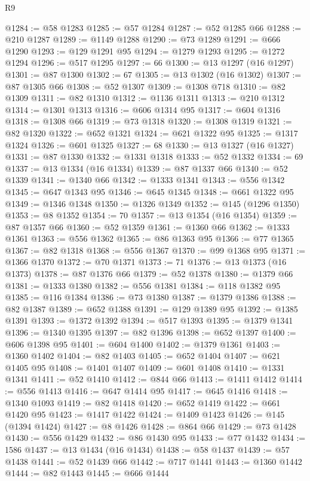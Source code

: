 \begin{lexlean}{R9}
\begin{coremodule}
@1284 := @58 @1283
@1285 := @57 @1284
@1287 := @52 @1285 @66
@1288 := @210 @1287
@1289 := @1149 @1288
@1290 := @73 @1289
@1291 := @666 @1290
@1293 := @129 @1291 @95
@1294 := @1279 @1293
@1295 := @1272 @1294
@1296 := @517 @1295
@1297 := 66
@1300 := @13 @1297 (@16 @1297)
@1301 := @87 @1300
@1302 := 67
@1305 := @13 @1302 (@16 @1302)
@1307 := @87 @1305 @66
@1308 := @52 @1307
@1309 := @1308 @718
@1310 := @82 @1309
@1311 := @82 @1310
@1312 := @1136 @1311
@1313 := @210 @1312
@1314 := @1301 @1313
@1316 := @606 @1314 @95
@1317 := @604 @1316
@1318 := @1308 @66
@1319 := @73 @1318
@1320 := @1308 @1319
@1321 := @82 @1320
@1322 := @652 @1321
@1324 := @621 @1322 @95
@1325 := @1317 @1324
@1326 := @601 @1325
@1327 := 68
@1330 := @13 @1327 (@16 @1327)
@1331 := @87 @1330
@1332 := @1331 @1318
@1333 := @52 @1332
@1334 := 69
@1337 := @13 @1334 (@16 @1334)
@1339 := @87 @1337 @66
@1340 := @52 @1339
@1341 := @1340 @66
@1342 := @1333 @1341
@1343 := @556 @1342
@1345 := @647 @1343 @95
@1346 := @645 @1345
@1348 := @661 @1322 @95
@1349 := @1346 @1348
@1350 := @1326 @1349
@1352 := @145 (@1296 @1350)
@1353 := @8 @1352
@1354 := 70
@1357 := @13 @1354 (@16 @1354)
@1359 := @87 @1357 @66
@1360 := @52 @1359
@1361 := @1360 @66
@1362 := @1333 @1361
@1363 := @556 @1362
@1365 := @86 @1363 @95
@1366 := @77 @1365
@1367 := @82 @1318
@1368 := @556 @1367
@1370 := @99 @1368 @95
@1371 := @1366 @1370
@1372 := @70 @1371
@1373 := 71
@1376 := @13 @1373 (@16 @1373)
@1378 := @87 @1376 @66
@1379 := @52 @1378
@1380 := @1379 @66
@1381 := @1333 @1380
@1382 := @556 @1381
@1384 := @118 @1382 @95
@1385 := @116 @1384
@1386 := @73 @1380
@1387 := @1379 @1386
@1388 := @82 @1387
@1389 := @652 @1388
@1391 := @129 @1389 @95
@1392 := @1385 @1391
@1393 := @1372 @1392
@1394 := @517 @1393
@1395 := @1379 @1341
@1396 := @1340 @1395
@1397 := @82 @1396
@1398 := @652 @1397
@1400 := @606 @1398 @95
@1401 := @604 @1400
@1402 := @1379 @1361
@1403 := @1360 @1402
@1404 := @82 @1403
@1405 := @652 @1404
@1407 := @621 @1405 @95
@1408 := @1401 @1407
@1409 := @601 @1408
@1410 := @1331 @1341
@1411 := @52 @1410
@1412 := @844 @66
@1413 := @1411 @1412
@1414 := @556 @1413
@1416 := @647 @1414 @95
@1417 := @645 @1416
@1418 := @1340 @1093
@1419 := @82 @1418
@1420 := @652 @1419
@1422 := @661 @1420 @95
@1423 := @1417 @1422
@1424 := @1409 @1423
@1426 := @145 (@1394 @1424)
@1427 := @8 @1426
@1428 := @864 @66
@1429 := @73 @1428
@1430 := @556 @1429
@1432 := @86 @1430 @95
@1433 := @77 @1432
@1434 := 1586
@1437 := @13 @1434 (@16 @1434)
@1438 := @58 @1437
@1439 := @57 @1438
@1441 := @52 @1439 @66
@1442 := @717 @1441
@1443 := @1360 @1442
@1444 := @82 @1443
@1445 := @666 @1444

\end{coremodule}
\end{lexlean}
